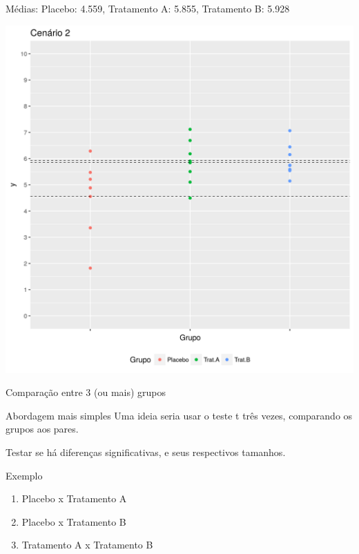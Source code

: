 \documentclass{beamer}
\begin{document}
\begin{frame}{Médias: Placebo: 4.559, Tratamento A: 5.855, Tratamento B: 5.928}
  \begin{center}
    \includegraphics[height=.9\textheight]{Topicos_adv/cenario2_medias}

  \end{center}
\end{frame}

\begin{frame}{Comparação entre 3 (ou mais) grupos}
  \begin{block}{Abordagem mais simples}
    Uma ideia seria usar o teste t três vezes, comparando os grupos aos pares.

    \bigskip
    Testar se há diferenças significativas, e seus respectivos tamanhos.
  \end{block}

  \begin{exampleblock}{Exemplo}
    \begin{enumerate}
    \item Placebo x Tratamento A
    \item Placebo x Tratamento B
    \item Tratamento A x Tratamento B
    \end{enumerate}
  \end{exampleblock}
\end{frame}
\end{document}
